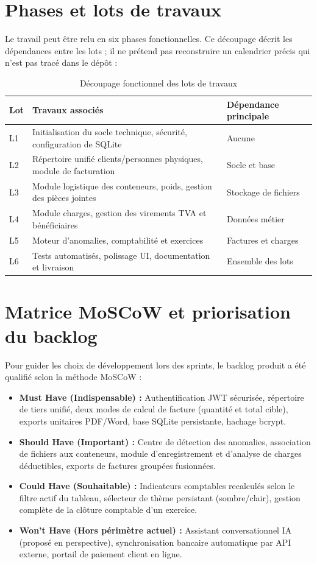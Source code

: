 \documentclass[12pt,a4paper,oneside]{report}
\begin{document}
\section{Phases et lots de travaux}
Le travail peut être relu en six phases fonctionnelles. Ce découpage décrit les dépendances entre les lots ; il ne prétend pas reconstruire un calendrier précis qui n'est pas tracé dans le dépôt :

\begin{table}[H]\centering
\caption{Découpage fonctionnel des lots de travaux}
\begin{tabularx}{\textwidth}{p{1.2cm}Y p{3cm}}
\toprule \textbf{Lot} & \textbf{Travaux associés} & \textbf{Dépendance principale}\\ \midrule
L1 & Initialisation du socle technique, sécurité, configuration de SQLite & Aucune\\
L2 & Répertoire unifié clients/personnes physiques, module de facturation & Socle et base\\
L3 & Module logistique des conteneurs, poids, gestion des pièces jointes & Stockage de fichiers\\
L4 & Module charges, gestion des virements TVA et bénéficiaires & Données métier\\
L5 & Moteur d'anomalies, comptabilité et exercices & Factures et charges\\
L6 & Tests automatisés, polissage UI, documentation et livraison & Ensemble des lots\\
\bottomrule
\end{tabularx}
\end{table}

\section{Matrice MoSCoW et priorisation du backlog}
Pour guider les choix de développement lors des sprints, le backlog produit a été qualifié selon la méthode MoSCoW :

\begin{itemize}
  \item \textbf{Must Have (Indispensable) :} Authentification JWT sécurisée, répertoire de tiers unifié, deux modes de calcul de facture (quantité et total cible), exports unitaires PDF/Word, base SQLite persistante, hachage bcrypt.
  \item \textbf{Should Have (Important) :} Centre de détection des anomalies, association de fichiers aux conteneurs, module d'enregistrement et d'analyse de charges déductibles, exports de factures groupées fusionnées.
  \item \textbf{Could Have (Souhaitable) :} Indicateurs comptables recalculés selon le filtre actif du tableau, sélecteur de thème persistant (sombre/clair), gestion complète de la clôture comptable d'un exercice.
  \item \textbf{Won't Have (Hors périmètre actuel) :} Assistant conversationnel IA (proposé en perspective), synchronisation bancaire automatique par API externe, portail de paiement client en ligne.
\end{itemize}
\end{document}
